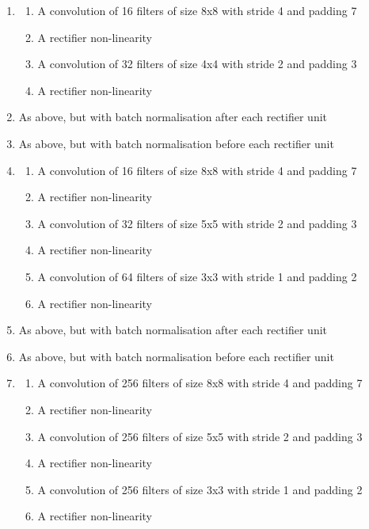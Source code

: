 \documentclass[12pt]{article}
\begin{document}
\begin{enumerate}
    \item \begin{enumerate}
        \item A convolution of 16 filters of size 8x8 with stride 4 and padding 7
        \item A rectifier non-linearity
        \item A convolution of 32 filters of size 4x4 with stride 2 and padding 3
        \item A rectifier non-linearity
    \end{enumerate}
    \item As above, but with batch normalisation after each rectifier unit
    \item As above, but with batch normalisation before each rectifier unit
    \item \begin{enumerate}
        \item A convolution of 16 filters of size 8x8 with stride 4 and padding 7
        \item A rectifier non-linearity
        \item A convolution of 32 filters of size 5x5 with stride 2 and padding 3
        \item A rectifier non-linearity
        \item A convolution of 64 filters of size 3x3 with stride 1 and padding 2
        \item A rectifier non-linearity
    \end{enumerate}    
    \item As above, but with batch normalisation after each rectifier unit
    \item As above, but with batch normalisation before each rectifier unit
    \item \begin{enumerate}
        \item A convolution of 256 filters of size 8x8 with stride 4 and padding 7
        \item A rectifier non-linearity
        \item A convolution of 256 filters of size 5x5 with stride 2 and padding 3
        \item A rectifier non-linearity
        \item A convolution of 256 filters of size 3x3 with stride 1 and padding 2
        \item A rectifier non-linearity
    \end{enumerate}  

\end{enumerate}
\end{document}

